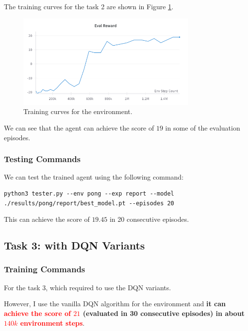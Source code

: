The training curves for the task 2 are shown in Figure \ref{fig:pong-vanilla-training-curve}.

\begin{figure}[H]
    \centering
    \includegraphics[width=0.8\textwidth]{figures/task2.png}
    \caption{Training curves for the \pong environment.}
    \label{fig:pong-vanilla-training-curve}
\end{figure}

We can see that the agent can achieve the score of $19$ in some of the evaluation episodes.

\subsubsection{Testing Commands}

We can test the trained agent using the following command:
\begin{verbatim}
python3 tester.py --env pong --exp report --model ./results/pong/report/best_model.pt --episodes 20
\end{verbatim}
This can achieve the score of $19.45$ in 20 consecutive episodes.

\subsection{Task 3: \pong with DQN Variants}

\subsubsection{Training Commands}

For the task 3, which required to use the DQN variants.

However, I use the vanilla DQN algorithm for the \pong environment and \textbf{it can \textcolor{red}{achieve the score of $21$} (evaluated in 30 consecutive episodes) in about \textcolor{red}{$140k$ environment steps}}.

